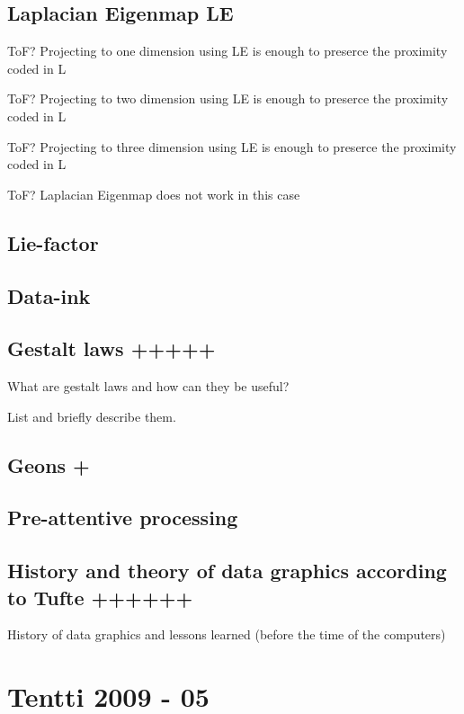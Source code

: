 \documentclass[a4paper]{article}
\begin{document}
\subsection{Laplacian Eigenmap LE}

ToF? Projecting to one dimension using LE is enough to preserce the proximity coded in L

ToF? Projecting to two dimension using LE is enough to preserce the proximity coded in L

ToF? Projecting to three dimension using LE is enough to preserce the proximity coded in L

ToF? Laplacian Eigenmap does not work in this case

\subsection{Lie-factor}

\subsection{Data-ink}

\subsection{Gestalt laws +++++}

What are gestalt laws and how can they be useful?

List and briefly describe them.

\subsection{Geons +}

\subsection{Pre-attentive processing}

\subsection{History and theory of data graphics according to Tufte ++++++}

History of data graphics and lessons learned (before the time of the computers)

\section{Tentti 2009 - 05}
\end{document}
